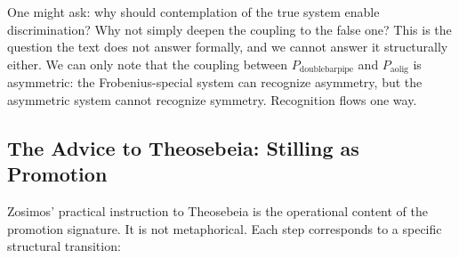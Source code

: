 \documentclass[12pt,a4paper]{article}
\begin{document}
One might ask: why should contemplation of the true system enable discrimination? Why not simply deepen the coupling to the false one? This is the question the text does not answer formally, and we cannot answer it structurally either. We can only note that the coupling between $P_{\text{doublebarpipe}}$ and $P_{\text{aolig}}$ is asymmetric: the Frobenius-special system can recognize asymmetry, but the asymmetric system cannot recognize symmetry. Recognition flows one way.

\subsection{The Advice to Theosebeia: Stilling as Promotion}

Zosimos' practical instruction to Theosebeia is the operational content of the promotion signature. It is not metaphorical. Each step corresponds to a specific structural transition:
\end{document}
